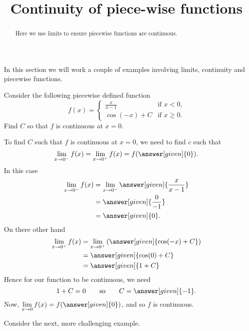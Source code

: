 \documentclass{ximera}
\title[Dig-In:]{Continuity of piece-wise functions}
\begin{document}
\begin{abstract}
Here we use limits to ensure piecewise functions are continuous.
\end{abstract}
\maketitle

In this section we will work a couple of examples involving limits,
continuity and piecewise functions.

\begin{example}
Consider the following piecewise defined function
\[
f(x) = 
\begin{cases}
  \frac{x}{x-1} &\text{if $x<0$,}\\
  \cos(-x) + C &\text{if $x\ge 0$}.
\end{cases}
\]
Find $C$ so that $f$ is continuous at $x=0$.
\begin{explanation}
  To find $C$ such that $f$ is continuous at $x=0$, we need to find
  $c$ such that
  \[
  \lim_{x\to 0^-} f(x) = \lim_{x\to 0^+}f(x) = f(\answer[given]{0}).
  \]
  In this case
  \begin{align*}
    \lim_{x\to 0^-} f(x) &= \lim_{x\to 0^-}\answer[given]{\frac{x}{x-1}}\\
    &= \answer[given]{\frac{0}{-1}}\\
    &=\answer[given]{0}.
  \end{align*}
  On there other hand
  \begin{align*}
    \lim_{x\to 0^+} f(x) &= \lim_{x\to 0^+}\left(\answer[given]{\cos(-x)+C}\right)\\
    &= \answer[given]{\cos(0) + C}\\
    &= \answer[given]{1+ C}
  \end{align*}
  Hence for our function to be continuous, we need
  \[
  1 + C = 0\qquad\text{so}\qquad C = \answer[given]{-1}.
  \]
  Now, $\displaystyle\lim_{x\to 0} f(x) = f(\answer[given]{0})$, and so $f$ is continuous.
\end{explanation}
\end{example}


Consider the next, more challenging example.
\end{document}
